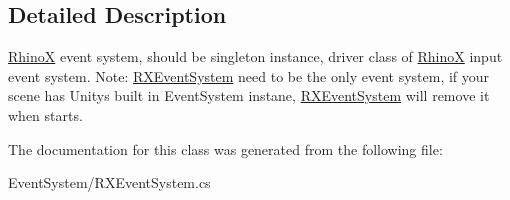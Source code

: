 \subsection{Detailed Description}
\mbox{\hyperlink{namespace_ximmerse_1_1_rhino_x}{RhinoX}} event system, should be singleton instance, driver class of \mbox{\hyperlink{namespace_ximmerse_1_1_rhino_x}{RhinoX}} input event system. Note\+: \mbox{\hyperlink{class_ximmerse_1_1_rhino_x_1_1_r_x_event_system}{R\+X\+Event\+System}} need to be the only event system, if your scene has Unity\textquotesingle{}s built in Event\+System instane, \mbox{\hyperlink{class_ximmerse_1_1_rhino_x_1_1_r_x_event_system}{R\+X\+Event\+System}} will remove it when starts. 



The documentation for this class was generated from the following file\+:\begin{DoxyCompactItemize}
\item 
Event\+System/R\+X\+Event\+System.\+cs\end{DoxyCompactItemize}
